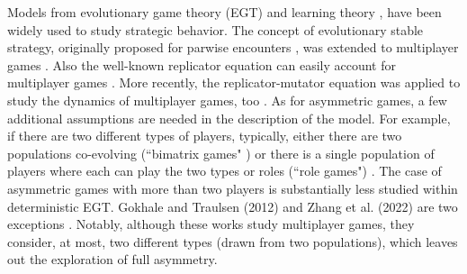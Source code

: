 \documentclass[11pt]{article}
\theoremstyle{plainCl1}
\theoremstyle{plainCl2}
\begin{document}
\noindent Models from evolutionary game theory (EGT) \cite{Maynard-Smith:Nature:1973, Maynard-Smith:book:1982, Hofbauer:book:1998, Nowak:book:2006} and learning theory \cite{Sandholm:BioSys:1996, Fudenberg:book:1998b, Macy:PNAS:2002, Pangallo:GEB:2022}, have been widely used to study strategic behavior. 
\noindent The concept of evolutionary stable strategy, originally proposed for parwise encounters \cite{Maynard-Smith:Nature:1973}, was extended to multiplayer games \cite{Palm:JMB:1984, Broom:BMB:1997, Bukowski:IJGT:2004}. Also the well-known replicator equation \cite{Taylor:MB:1978, Hofbauer:book:1998} 
can easily account for multiplayer games \cite{Hauert:JTB:2006a, gokhale:PNAS:2010, Pena:Evolution:2011, Cressman:PNAS:2014, Pena:JTB:2014}. More recently, the replicator-mutator equation was applied to study the dynamics of multiplayer games, too \cite{Duong:DGAA:2020}. 
As for asymmetric games, a few additional assumptions are needed in the description of the model. For example, if there are two different types of players, typically, either there are two populations co-evolving (``bimatrix games" \cite{Hofbauer:book:1998, Gokhale:PRSB:2012, Tuyls:SciRep:2018}) or there is a single population of players where each can play the two types or roles (``role games") \cite{Hofbauer:book:1998}. 
The case of asymmetric games with more than two players is substantially less studied within deterministic EGT. Gokhale and Traulsen (2012) and Zhang et al. (2022) are two exceptions \cite{Gokhale:PRSB:2012, Zhang:arxiv:2022}. Notably, although these works study multiplayer games, they consider, at most, two different types (drawn from two populations), which leaves out the exploration of full asymmetry.
\end{document}
